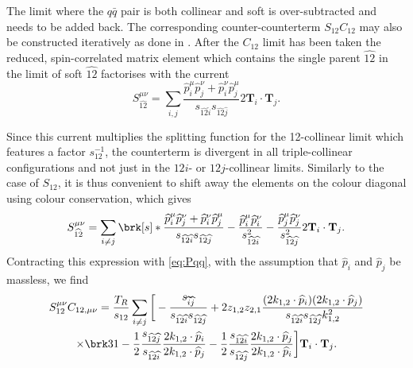 \documentclass[11pt,a4paper]{article}
\newcommand{\colorT}[1]{\mathbf{T}_{#1}}
\newcommand{\mgd}[1]{\widehat{#1}}
\begin{document}
The limit where the $q\bar{q}$ pair is both collinear and soft is over-subtracted
and needs to be added back.
The corresponding counter-counterterm $S_{12}C_{12}$
may also be constructed iteratively as done in \cite{Somogyi:2005xz}.
After the $C_{12}$ limit has been taken the reduced, spin-correlated matrix element 
which contains the single parent $\mgd{12}$ in the limit of soft $\mgd{12}$
factorises with the current
\begin{equation}
	S_{\mgd{12}}^{\mu\nu}
	= \sum_{i, j}
	\frac{\mgd{p}_i^\mu \mgd{p}_j^\nu + \mgd{p}_i^\nu \mgd{p}_j^\mu}
	{s_{\mgd{12}\mgd{i}} s_{\mgd{12}\mgd{j}}}
	2\colorT{i}\cdot\colorT{j}.
\end{equation}

Since this current multiplies the splitting function for the 12-collinear limit
which features a factor $s_{12}^{-1}$,
the counterterm is divergent in all triple-collinear configurations
and not just in the $12i$- or $12j$-collinear limits.
Similarly to the case of $S_{12}$, it is thus convenient
to shift away the elements on the colour diagonal using colour conservation,
which gives
\begin{equation}
	S_{\mgd{12}}^{\mu\nu}
	= \sum_{i \ne j} \brk[s]*{
		\frac{\mgd{p}_i^\mu \mgd{p}_j^\nu + \mgd{p}_i^\nu \mgd{p}_j^\mu}
		{s_{\mgd{12}\mgd{i}} s_{\mgd{12}\mgd{j}}}
		- \frac{\mgd{p}_i^\mu \mgd{p}_i^\nu}{s_{\mgd{12}\mgd{i}}^2}
		- \frac{\mgd{p}_j^\mu \mgd{p}_j^\nu}{s_{\mgd{12}\mgd{j}}^2}
	} 2 \colorT{i}\cdot\colorT{j}.
\end{equation}
Contracting this expression with \cref{eq:Pqq},
with the assumption that $\mgd{p}_i$ and $\mgd{p}_j$
be massless, we find
\begin{multline}
	S_{12}^{\mu\nu} C_{12,\mu\nu}
	= \frac{T_R}{s_{12}} \sum_{i \ne j} \bigg[
		- \frac{s_{\mgd{i}\mgd{j}}}{s_{\mgd{12}\mgd{i}}s_{\mgd{12}\mgd{j}}}
		+ 2 z_{1,2} z_{2,1}
		\frac{(2k_{1,2}\cdot\mgd{p}_i)(2k_{1,2}\cdot\mgd{p}_j)}
		{s_{\mgd{12}\mgd{i}} s_{\mgd{12}\mgd{j}} k_{1,2}^2}
		\\\times
		\brk3{ 1
		- \frac{1}{2} \frac{s_{\mgd{12}\mgd{j}}}{s_{\mgd{12}\mgd{i}}}
		\frac{2k_{1,2}\cdot\mgd{p}_i}{2k_{1,2}\cdot\mgd{p}_j}
		- \frac{1}{2} \frac{s_{\mgd{12}\mgd{i}}}{s_{\mgd{12}\mgd{j}}}
		\frac{2k_{1,2}\cdot\mgd{p}_j}{2k_{1,2}\cdot\mgd{p}_i}
		}
	\bigg] \colorT{i}\cdot\colorT{j}.
\end{multline}
\end{document}
